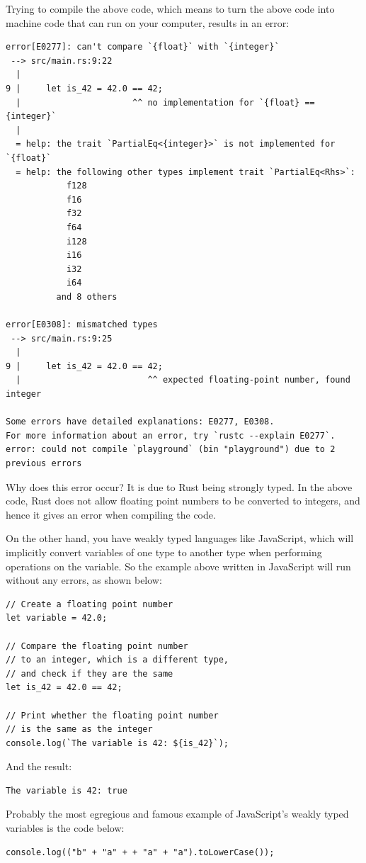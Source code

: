 \documentclass[11pt]{article}
\begin{document}
Trying to compile the above code, which means
to turn the above code into machine code
that can run on your computer, results in
an error:
\begin{verbatim}
error[E0277]: can't compare `{float}` with `{integer}`
 --> src/main.rs:9:22
  |
9 |     let is_42 = 42.0 == 42;
  |                      ^^ no implementation for `{float} == {integer}`
  |
  = help: the trait `PartialEq<{integer}>` is not implemented for `{float}`
  = help: the following other types implement trait `PartialEq<Rhs>`:
            f128
            f16
            f32
            f64
            i128
            i16
            i32
            i64
          and 8 others

error[E0308]: mismatched types
 --> src/main.rs:9:25
  |
9 |     let is_42 = 42.0 == 42;
  |                         ^^ expected floating-point number, found integer

Some errors have detailed explanations: E0277, E0308.
For more information about an error, try `rustc --explain E0277`.
error: could not compile `playground` (bin "playground") due to 2 previous errors
\end{verbatim}

Why does this error occur? It is due to
Rust being strongly typed. In the above code,
Rust does not allow floating point numbers
to be converted to integers, and hence
it gives an error when compiling the code.

 \newpage

On the other hand, you have weakly typed languages like JavaScript,
which will implicitly convert variables of one type to another type
when performing operations on the variable.
So the example above written in JavaScript will run without any errors,
as shown below:
\begin{verbatim}
// Create a floating point number
let variable = 42.0;

// Compare the floating point number
// to an integer, which is a different type,
// and check if they are the same
let is_42 = 42.0 == 42;

// Print whether the floating point number
// is the same as the integer
console.log(`The variable is 42: ${is_42}`);
\end{verbatim}

And the result:
\begin{verbatim}
The variable is 42: true
\end{verbatim}

Probably the most egregious and famous example of
JavaScript's weakly typed variables is the code below:
\begin{verbatim}
console.log(("b" + "a" + + "a" + "a").toLowerCase());
\end{verbatim}
\end{document}
